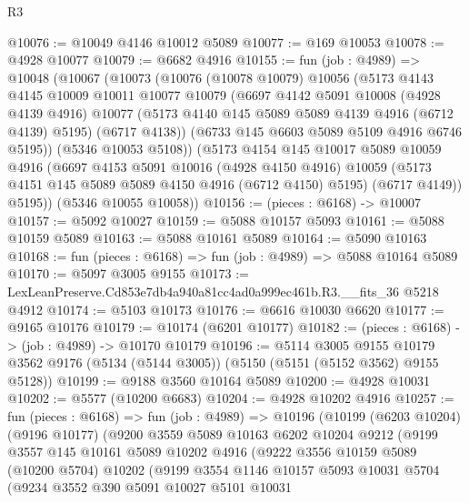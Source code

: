 \begin{lexlean}{R3}
\begin{coremodule}
@10076 := @10049 @4146 @10012 @5089
@10077 := @169 @10053
@10078 := @4928 @10077
@10079 := @6682 @4916
@10155 := fun (job : @4989) =>
  @10048
    (@10067
      (@10073
        (@10076
          (@10078 @10079)
          @10056
          (@5173
            @4143
            @4145
            @10009
            @10011
            @10077
            @10079
            (@6697
              @4142
              @5091
              @10008
              (@4928 @4139 @4916)
              @10077
              (@5173 @4140 @145 @5089 @5089 @4139 @4916 (@6712 @4139) @5195)
              (@6717 @4138))
            (@6733 @145 @6603 @5089 @5109 @4916 @6746 @5195))
          (@5346 @10053 @5108))
        (@5173
          @4154
          @145
          @10017
          @5089
          @10059
          @4916
          (@6697
            @4153
            @5091
            @10016
            (@4928 @4150 @4916)
            @10059
            (@5173 @4151 @145 @5089 @5089 @4150 @4916 (@6712 @4150) @5195)
            (@6717 @4149))
          @5195))
      (@5346 @10055 @10058))
@10156 := (pieces : @6168) -> @10007
@10157 := @5092 @10027
@10159 := @5088 @10157 @5093
@10161 := @5088 @10159 @5089
@10163 := @5088 @10161 @5089
@10164 := @5090 @10163
@10168 := fun (pieces : @6168) => fun (job : @4989) => @5088 @10164 @5089
@10170 := @5097 @3005 @9155
@10173 := LexLeanPreserve.Cd853e7db4a940a81cc4ad0a999ec461b.R3.__fits_36 @5218 @4912
@10174 := @5103 @10173
@10176 := @6616 @10030 @6620
@10177 := @9165 @10176
@10179 := @10174 (@6201 @10177)
@10182 := (pieces : @6168) -> (job : @4989) -> @10170 @10179
@10196 := @5114
    @3005
    @9155
    @10179
    @3562
    @9176
    (@5134 (@5144 @3005))
    (@5150 (@5151 (@5152 @3562) @9155 @5128))
@10199 := @9188 @3560 @10164 @5089
@10200 := @4928 @10031
@10202 := @5577 (@10200 @6683)
@10204 := @4928 @10202 @4916
@10257 := fun (pieces : @6168) =>
  fun (job : @4989) =>
  @10196
    (@10199
      (@6203 @10204)
      (@9196 @10177)
      (@9200
        @3559
        @5089
        @10163
        @6202
        @10204
        @9212
        (@9199
          @3557
          @145
          @10161
          @5089
          @10202
          @4916
          (@9222
            @3556
            @10159
            @5089
            (@10200 @5704)
            @10202
            (@9199
              @3554
              @1146
              @10157
              @5093
              @10031
              @5704
              (@9234
                @3552
                @390
                @5091
                @10027
                @5101
                @10031

\end{coremodule}
\end{lexlean}
